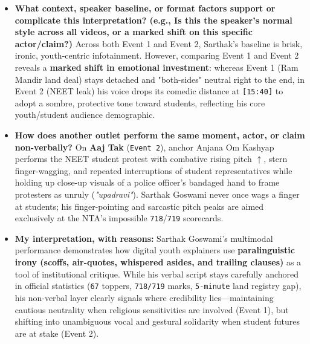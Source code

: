 \documentclass[10pt,a4paper]{article}
\begin{document}
\begin{itemize}
  \item \textbf{What context, speaker baseline, or format factors support or complicate this interpretation? (e.g., Is this the speaker's normal style across all videos, or a marked shift on this specific actor/claim?)}
Across both Event 1 and Event 2, Sarthak's baseline is brisk, ironic, youth-centric infotainment. However, comparing Event 1 and Event 2 reveals a \textbf{marked shift in emotional investment}: whereas Event 1 (Ram Mandir land deal) stays detached and "both-sides" neutral right to the end, in Event 2 (NEET leak) his voice drops its comedic distance at \texttt{[15:40]} to adopt a sombre, protective tone toward students, reflecting his core youth/student audience demographic.\par\smallskip
  \item \textbf{How does another outlet perform the same moment, actor, or claim non-verbally?}
On \textbf{Aaj Tak} (\texttt{Event 2}), anchor Anjana Om Kashyap performs the NEET student protest with combative rising pitch \texttt{$\uparrow$}, stern finger-wagging, and repeated interruptions of student representatives while holding up close-up visuals of a police officer's bandaged hand to frame protesters as unruly (\textit{"upadravi"}). Sarthak Goswami never once wags a finger at students; his finger-pointing and sarcastic pitch peaks are aimed exclusively at the NTA's impossible \texttt{718}/\texttt{719} scorecards.\par\smallskip
  \item \textbf{My interpretation, with reasons:}
Sarthak Goswami's multimodal performance demonstrates how digital youth explainers use \textbf{paralinguistic irony (scoffs, air-quotes, whispered asides, and trailing clauses)} as a tool of institutional critique. While his verbal script stays carefully anchored in official statistics (\texttt{67} toppers, \texttt{718/719} marks, \texttt{5-minute} land registry gap), his non-verbal layer clearly signals where credibility lies---maintaining cautious neutrality when religious sensitivities are involved (Event 1), but shifting into unambiguous vocal and gestural solidarity when student futures are at stake (Event 2).\par\smallskip
\end{itemize}
\end{document}
